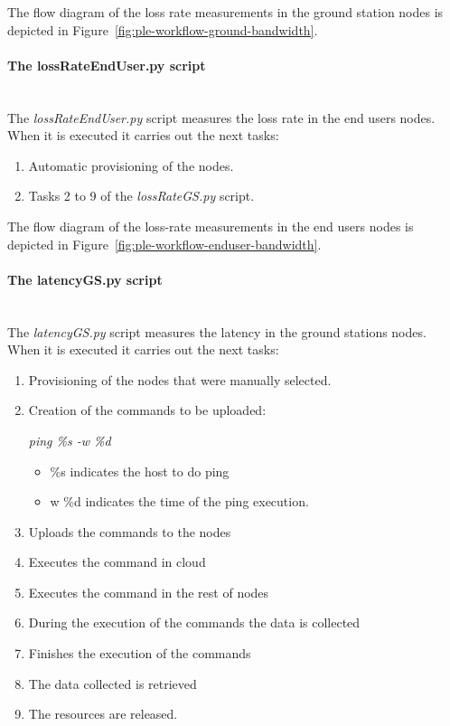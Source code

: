 The flow diagram of the loss rate measurements in the ground station nodes is
depicted in Figure~\ref{fig:ple-workflow-ground-bandwidth}.

\paragraph{The lossRateEndUser.py script}~\\

The \emph{lossRateEndUser.py} script measures the loss rate in the end users
nodes. When it is executed it carries out the next tasks:
\begin{enumerate}
\item Automatic provisioning of the nodes.
\item Tasks 2 to 9 of the \emph{lossRateGS.py} script.
\end{enumerate}
The flow diagram of the loss-rate measurements in the end users nodes is
depicted in Figure~\ref{fig:ple-workflow-enduser-bandwidth}.

\paragraph{The latencyGS.py script}~\\

The \emph{latencyGS.py}  script measures the latency  in the ground stations
nodes. When it is executed it carries out the next tasks:
\begin{enumerate}

\item Provisioning of the nodes that were manually selected.
\item Creation of the commands to be uploaded:

\emph{ping \%s -w \%d}
\begin{itemize}
\item \%s indicates the host to do ping
\item w \%d indicates the time of the ping execution.
\end{itemize}
\item Uploads the commands to the nodes
\item Executes the command in cloud
\item Executes the command in the rest of nodes
\item During the execution of the commands the data is collected
\item Finishes the execution of the commands
\item The data collected is retrieved
\item The resources are released.
\end{enumerate}

